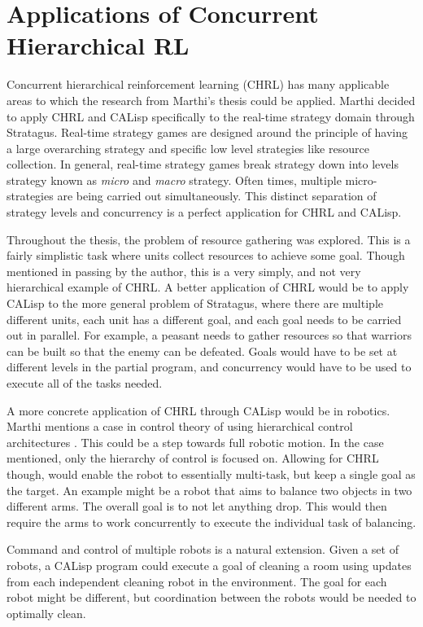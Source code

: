 \documentclass[jair,twoside,11pt,theapa]{article}
\begin{document}
\section{Applications of Concurrent Hierarchical RL}
\label{Applications}

Concurrent hierarchical reinforcement learning (CHRL) has many applicable areas to which the research from Marthi's thesis could be applied. Marthi decided to apply CHRL and CALisp specifically to the real-time strategy domain through Stratagus. Real-time strategy games are designed around the principle of having a large overarching strategy and specific low level strategies like resource collection. In general, real-time strategy games break strategy down into levels strategy known as \textit{micro} and \textit{macro} strategy. Often times, multiple micro-strategies are being carried out simultaneously. This distinct separation of strategy levels and concurrency is a perfect application for CHRL and CALisp. 

Throughout the thesis, the problem of resource gathering was explored. This is a fairly simplistic task where units collect resources to achieve some goal. Though mentioned in passing by the author, this is a very simply, and not very hierarchical example of CHRL. A better application of CHRL would be to apply CALisp to the more general problem of Stratagus, where there are multiple different units, each unit has a different goal, and each goal needs to be carried out in parallel. For example, a peasant needs to gather resources so that warriors can be built so that the enemy can be defeated. Goals would have to be set at different levels in the partial program, and concurrency would have to be used to execute all of the tasks needed. 


A more concrete application of CHRL through CALisp would be in robotics. Marthi mentions a case in control theory of using hierarchical control architectures \cite{Todorov:2005}. This could be a step towards full robotic motion. In the case mentioned, only the hierarchy of control is focused on. Allowing for CHRL though, would enable the robot to essentially multi-task, but keep a single goal as the target. An example might be a robot that aims to balance two objects in two different arms. The overall goal is to not let anything drop. This would then require the arms to work concurrently to execute the individual task of balancing. 

Command and control of multiple robots is a natural extension. Given a set of robots, a CALisp program could execute a goal of cleaning a room using updates from each independent cleaning robot in the environment. The goal for each robot might be different, but coordination between the robots would be needed to optimally clean.  
\end{document}
